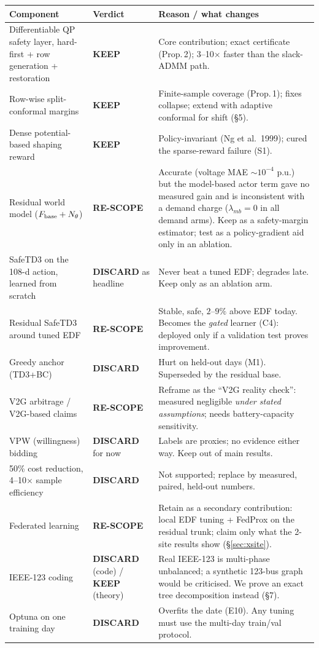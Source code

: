 \documentclass[10pt,a4paper]{article}
\newcommand{\ok}{\textcolor{green!45!black}{\textbf{KEEP}}}
\newcommand{\re}{\textcolor{orange!80!black}{\textbf{RE-SCOPE}}}
\newcommand{\dis}{\textcolor{red!70!black}{\textbf{DISCARD}}}
\begin{document}
\begin{longtable}{@{}p{.24\linewidth}p{.08\linewidth}p{.62\linewidth}@{}}
\toprule Component & Verdict & Reason / what changes\\\midrule\endhead
Differentiable QP safety layer, hard-first + row generation + restoration & \ok & Core contribution; exact certificate (Prop.\,2); 3--10$\times$ faster than the slack-ADMM path.\\
Row-wise split-conformal margins & \ok & Finite-sample coverage (Prop.\,1); fixes collapse; extend with adaptive conformal for shift (\S5).\\
Dense potential-based shaping reward & \ok & Policy-invariant (Ng et al.\ 1999); cured the sparse-reward failure (S1).\\
Residual world model ($F_{\rm base}+N_\theta$) & \re & Accurate (voltage MAE $\sim10^{-4}$ p.u.) but the model-based actor term gave no measured gain and is inconsistent with a demand charge ($\lambda_{mb}=0$ in all demand arms). Keep as a safety-margin estimator; test as a policy-gradient aid only in an ablation.\\
SafeTD3 on the 108-d action, learned from scratch & \dis{} as headline & Never beat a tuned EDF; degrades late. Keep only as an ablation arm.\\
Residual SafeTD3 around tuned EDF & \re & Stable, safe, $2$--$9\%$ above EDF today. Becomes the \emph{gated} learner (C4): deployed only if a validation test proves improvement.\\
Greedy anchor (TD3+BC) & \dis & Hurt on held-out days (M1). Superseded by the residual base.\\
V2G arbitrage / V2G-based claims & \re & Reframe as the ``V2G reality check'': measured negligible \emph{under stated assumptions}; needs battery-capacity sensitivity.\\
VPW (willingness) bidding & \dis{} for now & Labels are proxies; no evidence either way. Keep out of main results.\\
50\% cost reduction, 4--10$\times$ sample efficiency & \dis & Not supported; replace by measured, paired, held-out numbers.\\
Federated learning & \re & Retain as a secondary contribution: local EDF tuning + FedProx on the residual trunk; claim only what the 2-site results show (\S\ref{sec:xsite}).\\
IEEE-123 coding & \dis{} (code) / \ok{} (theory) & Real IEEE-123 is multi-phase unbalanced; a synthetic 123-bus graph would be criticised. We prove an exact tree decomposition instead (\S7).\\
Optuna on one training day & \dis & Overfits the date (E10). Any tuning must use the multi-day train/val protocol.\\
\bottomrule\end{longtable}
\normalsize
\end{document}
